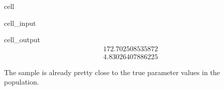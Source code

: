 \documentclass[letterpaper,10pt,english]{jupyterBook}
\begin{document}
\begin{sphinxuseclass}{cell}\begin{sphinxVerbatimInput}

\begin{sphinxuseclass}{cell_input}
\begin{sphinxVerbatim}[commandchars=\\\{\}]
\end{sphinxVerbatim}

\end{sphinxuseclass}\end{sphinxVerbatimInput}
\begin{sphinxVerbatimOutput}

\begin{sphinxuseclass}{cell_output}\begin{equation*}
\begin{split}172.702508535872\end{split}
\end{equation*}\begin{equation*}
\begin{split}4.83026407886225\end{split}
\end{equation*}
\end{sphinxuseclass}\end{sphinxVerbatimOutput}

\end{sphinxuseclass}
\sphinxAtStartPar
The sample is already pretty close to the true parameter values in the population.
\end{document}
